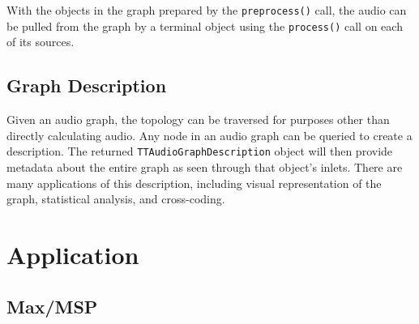 \documentclass[twoside,a4paper]{article}
\begin{document}
With the objects in the graph prepared by the \texttt{preprocess()} call, the audio can be pulled from the graph by a terminal object using the \texttt{process()} call on each of its sources.





\subsection{Graph Description} %

Given an audio graph, the topology can be traversed for purposes other than directly calculating audio.  
Any node in an audio graph can be queried to create a description.  The returned \texttt{TTAudioGraphDescription} object will then provide metadata about the entire graph as seen through that object's inlets.  
There are many applications of this description, including visual representation of the graph, statistical analysis, and cross-coding.






%
\section{Application} %
%


\subsection{Max/MSP} %
\end{document}
